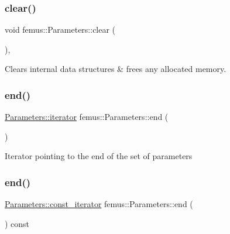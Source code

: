 \subsubsection{\texorpdfstring{clear()}{clear()}}
{\footnotesize\ttfamily void femus\+::\+Parameters\+::clear (\begin{DoxyParamCaption}{ }\end{DoxyParamCaption})\hspace{0.3cm}{\ttfamily [inline]}, {\ttfamily [virtual]}}

Clears internal data structures \& frees any allocated memory. \mbox{\label{classfemus_1_1_parameters_a7c104ff6b7ed478cbf4fa02573baa93d}} 
\subsubsection{\texorpdfstring{end()}{end()}\hspace{0.1cm}{\footnotesize\ttfamily [1/2]}}
{\footnotesize\ttfamily \mbox{\hyperlink{classfemus_1_1_parameters_a2cbdfdaaa2d9438d9a6900aa62c8295b}{Parameters\+::iterator}} femus\+::\+Parameters\+::end (\begin{DoxyParamCaption}{ }\end{DoxyParamCaption})\hspace{0.3cm}{\ttfamily [inline]}}

Iterator pointing to the end of the set of parameters \mbox{\label{classfemus_1_1_parameters_a73fed9732419624c19026581ecf45f0d}} 
\subsubsection{\texorpdfstring{end()}{end()}\hspace{0.1cm}{\footnotesize\ttfamily [2/2]}}
{\footnotesize\ttfamily \mbox{\hyperlink{classfemus_1_1_parameters_aa561fb692a63fe58dcec20374e9569c2}{Parameters\+::const\+\_\+iterator}} femus\+::\+Parameters\+::end (\begin{DoxyParamCaption}{ }\end{DoxyParamCaption}) const\hspace{0.3cm}{\ttfamily [inline]}}

